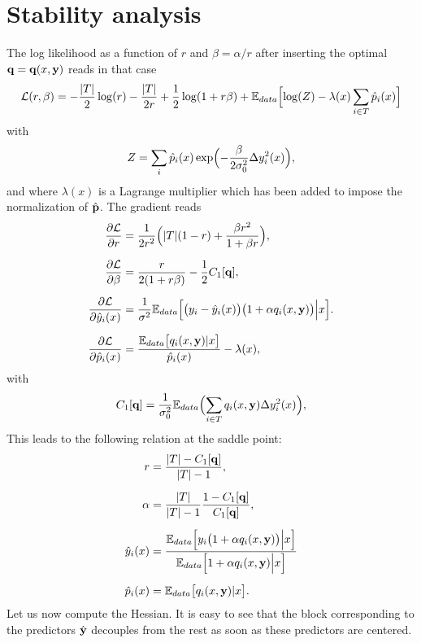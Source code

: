 \chapter{Stability analysis}\label{app:Hessian}
The log likelihood as a function of $r$ and $\beta=\alpha/r$ after inserting the optimal
${\bf q} = {\bf q}(x,{\bf y})$ reads in that case
\[
{\cal L}(r,\beta) = -\frac{\vert T\vert}{2}\log(r)-\frac{\vert T\vert}{2r}+\frac{1}{2}\log(1+r\beta)+{\mathbb E}_{data}\Bigl[\log(Z)-\lambda(x)\sum_{i\in T} \hat p_i(x)\Bigr]
\]
with
\[
Z = \sum_i \hat p_i(x)\exp\Bigl(-\frac{\beta}{2\sigma_0^2}\Delta y_i^2(x)\Bigr),
\]
and where $\lambda(x)$ is a Lagrange multiplier which has been added to impose the normalization of $\hat {\bf p}$.
The gradient reads
\begin{align*}
  \frac{\partial {\cal L}}{\partial r} &= \frac{1}{2r^2}\Bigl(\vert T\vert(1-r)+\frac{\beta r^2}{1+\beta r}\Bigr),\\[0.2cm]
  \frac{\partial {\cal L}}{\partial \beta} &= \frac{r}{2(1+r\beta)}-\frac{1}{2}C_1[{\bf q}],\\[0.2cm]
  \frac{\partial{\cal L}}{\partial \hat y_i(x)} &= \frac{1}{\sigma^2}{\mathbb E}_{data}\Bigl[ \bigl(y_i-\hat y_i(x)\bigr)\bigl(1+\alpha q_i(x,{\bf y})\bigr)\Big\vert x\Bigr].\\[0.2cm]
  \frac{\partial {\cal L}}{\partial \hat p_i(x)} &= \frac{{\mathbb E}_{data}\bigl[ q_i(x,{\bf y})\vert x \bigr]}{\hat p_i(x)}-\lambda(x),
\end{align*}
with
\[
C_1[{\bf q}] = \frac{1}{\sigma_0^2}{\mathbb E}_{data}\Bigl(\sum_{i\in T} q_i(x,{\bf y})\Delta y_i^2(x)\Bigr),
\]
This leads to the following relation at the saddle point:
\begin{align*}
  r &= \frac{\vert T\vert-C_1[{\bf q}]}{\vert T\vert-1},\\[0.2cm]
  \alpha &= \frac{\vert T\vert}{\vert T\vert-1}\frac{1-C_1[{\bf q}]}{C_1[{\bf q}]},\\[0.2cm]
\hat y_i(x) &= \frac{{\mathbb E}_{data}\Bigl[y_i\bigl(1+\alpha q_i(x,{\bf y})\bigr)\Big\vert x\Bigr]}
{{\mathbb E}_{data}\Bigl[1+\alpha q_i(x,{\bf y})\Big\vert x\Bigr]}\\[0.2cm]
  \hat p_i(x) &= \mathbb{E}_{data}\bigl[ q_i(x,{\bf y})\vert x \bigr].
\end{align*}
Let us now compute the Hessian. It is easy to see that the block corresponding to the predictors $\hat{\bf y}$ decouples from the rest as soon as these predictors are centered. 

